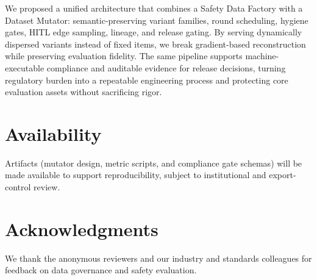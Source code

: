 \documentclass[letterpaper,twocolumn,10pt]{article}
\begin{document}
We proposed a unified architecture that combines a Safety Data Factory with a Dataset Mutator: semantic-preserving variant families, round scheduling, hygiene gates, HITL edge sampling, lineage, and release gating. By serving dynamically dispersed variants instead of fixed items, we break gradient-based reconstruction while preserving evaluation fidelity. The same pipeline supports machine-executable compliance and auditable evidence for release decisions, turning regulatory burden into a repeatable engineering process and protecting core evaluation assets without sacrificing rigor.

\section*{Availability}
Artifacts (mutator design, metric scripts, and compliance gate schemas) will be made available to support reproducibility, subject to institutional and export-control review.

\section*{Acknowledgments}
We thank the anonymous reviewers and our industry and standards colleagues for feedback on data governance and safety evaluation.



\end{document}
